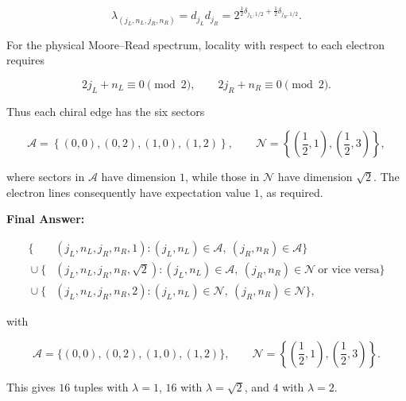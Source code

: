 \documentclass[11pt]{article}
\begin{document}
\[
\lambda_{(j_L,n_L,j_R,n_R)}
=d_{j_L}d_{j_R}
=2^{\frac12\delta_{j_L,1/2}+\frac12\delta_{j_R,1/2}}.
\]

For the physical Moore--Read spectrum, locality with respect to each electron requires

\[
2j_L+n_L\equiv0\pmod 2,
\qquad
2j_R+n_R\equiv0\pmod 2.
\]

Thus each chiral edge has the six sectors

\[
\mathcal A=
\left\{
(0,0),(0,2),(1,0),(1,2)
\right\},
\qquad
\mathcal N=
\left\{
\left(\frac12,1\right),
\left(\frac12,3\right)
\right\},
\]

where sectors in $\mathcal A$ have dimension $1$, while those in $\mathcal N$ have dimension $\sqrt2$. The electron lines consequently have expectation value $1$, as required.

\textbf{Final Answer:}

\[
\boxed{
\begin{aligned}
\Big\{&(j_L,n_L,j_R,n_R,1):
 (j_L,n_L)\in\mathcal A,\ (j_R,n_R)\in\mathcal A\Big\}\\
{}\cup\Big\{&(j_L,n_L,j_R,n_R,\sqrt2):
 (j_L,n_L)\in\mathcal A,\ (j_R,n_R)\in\mathcal N
 \ \text{or vice versa}\Big\}\\
{}\cup\Big\{&(j_L,n_L,j_R,n_R,2):
 (j_L,n_L)\in\mathcal N,\ (j_R,n_R)\in\mathcal N\Big\},
\end{aligned}}
\]

with

\[
\mathcal A=\{(0,0),(0,2),(1,0),(1,2)\},
\qquad
\mathcal N=\left\{\left(\frac12,1\right),\left(\frac12,3\right)\right\}.
\]

This gives $16$ tuples with $\lambda=1$, $16$ with $\lambda=\sqrt2$, and $4$ with $\lambda=2$.
\end{document}
